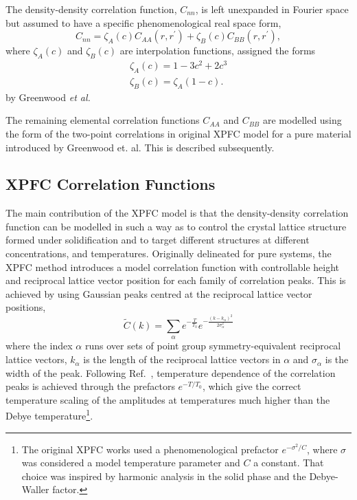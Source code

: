 \documentclass[showkeys, prb, reprint]{revtex4-1}
\newcommand{\f}{\frac}          %
\begin{document}
The density-density correlation function, $C_{nn}$, is left unexpanded in 
Fourier space but assumed to have a specific phenomenological real space form,
%
\begin{equation}
    \label{eq:xpfc_corr}
    C_{nn} = \zeta_A(c) C_{AA}(r, r^\prime) 
           + \zeta_B(c) C_{BB}(r, r^\prime),
\end{equation}
%
where $\zeta_A(c)$ and $\zeta_B(c)$ are interpolation functions, assigned the forms
%
\begin{gather}
    \zeta_A(c) = 1 - 3c^2 + 2c^3 \\
    \zeta_B(c) = \zeta_A(1 - c).
    \label{interpol}
\end{gather}
%
by Greenwood \textit{et al.} \cite{GREENWOOD11_BINARY}

The remaining elemental correlation functions $C_{AA}$ and $C_{BB}$ are modelled
using the form of the two-point correlations in original XPFC model for a pure material 
introduced by Greenwood et. al. \cite{GREENWOOD10} This is described subsequently.

\subsection{XPFC Correlation Functions} %
The main contribution of the XPFC model is that the density-density
correlation function can be modelled in such a way as to control the crystal
lattice structure formed under solidification and to target different structures at
different concentrations, and temperatures. Originally delineated for pure
systems, the XPFC method introduces a model correlation function with controllable height and reciprocal lattice vector position for each family of correlation peaks. This is achieved by using Gaussian peaks centred at the reciprocal lattice vector positions,
%
\begin{equation}
    \tilde{C}(k) = \sum_{\alpha} e^{-\f{T}{T_0}}
        e^{ - \f{(k - k_\alpha)^2}{2\sigma_\alpha^2}}
        \label{XPFC_C2}
\end{equation}
%
where the index $\alpha$ runs over sets of point group symmetry-equivalent
reciprocal lattice vectors, $k_\alpha$ is the length of the reciprocal lattice
vectors in $\alpha$ and $\sigma_\alpha$ is the width of the peak. Following Ref.~\cite{ALSTER17}, temperature dependence of the correlation peaks  is achieved through the prefactors $e^{-T / T_0}$, which give the correct temperature scaling of the amplitudes at temperatures much higher than the Debye temperature\footnote{The original XPFC works used a phenomenological prefactor $e^{-\sigma^2 / C}$, where $\sigma$ was considered a model temperature parameter and $C$ a constant. That choice was inspired by harmonic analysis in the solid phase and the Debye-Waller factor.}.
\end{document}
